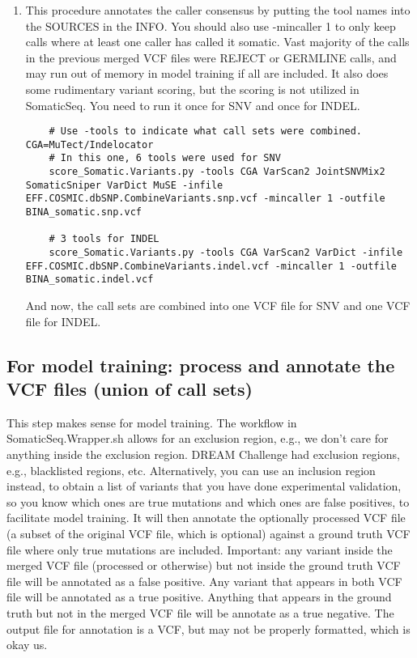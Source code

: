 \documentclass[10pt,letterpaper]{article}
\begin{document}
\begin{enumerate}
	
	\item
	This procedure annotates the caller consensus by putting the tool names into the SOURCES in the INFO. You should also use -mincaller 1 to only keep calls where at least one caller has called it somatic. Vast majority of the calls in the previous merged VCF files were REJECT or GERMLINE calls, and may run out of memory in model training if all are included. It also does some rudimentary variant scoring, but the scoring is not utilized in SomaticSeq. You need to run it once for SNV and once for INDEL. 
	
	\begin{lstlisting}
	# Use -tools to indicate what call sets were combined. CGA=MuTect/Indelocator
	# In this one, 6 tools were used for SNV
	score_Somatic.Variants.py -tools CGA VarScan2 JointSNVMix2 SomaticSniper VarDict MuSE -infile EFF.COSMIC.dbSNP.CombineVariants.snp.vcf -mincaller 1 -outfile BINA_somatic.snp.vcf
	
	# 3 tools for INDEL
	score_Somatic.Variants.py -tools CGA VarScan2 VarDict -infile EFF.COSMIC.dbSNP.CombineVariants.indel.vcf -mincaller 1 -outfile BINA_somatic.indel.vcf
	\end{lstlisting}
	
	And now, the call sets are combined into one VCF file for SNV and one VCF file for INDEL.

	
	\end{enumerate}





	\subsection{For model training: process and annotate the VCF files (union of call sets)}

	This step makes sense for model training. The workflow in SomaticSeq.Wrapper.sh allows for an exclusion region, e.g., we don't care for anything inside the exclusion region. DREAM Challenge had exclusion regions, e.g., blacklisted regions, etc. Alternatively, you can use an inclusion region instead, to obtain a list of variants that you have done experimental validation, so you know which ones are true mutations and which ones are false positives, to facilitate model training. 
	It will then annotate the optionally processed VCF file (a subset of the original VCF file, which is optional) against a ground truth VCF file where only true mutations are included. Important: any variant inside the merged VCF file (processed or otherwise) but not inside the ground truth VCF file will be annotated as a false positive. Any variant that appears in both VCF file will be annotated as a true positive. Anything that appears in the ground truth but not in the merged VCF file will be annotate as a true negative. The output file for annotation is a VCF, but may not be properly formatted, which is okay us. 
	
\end{document}
